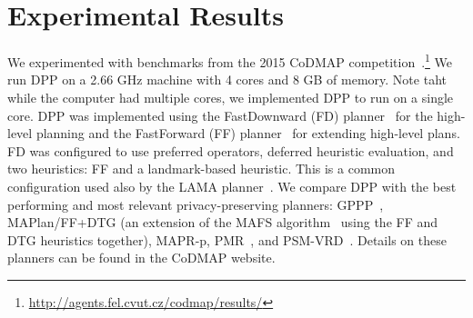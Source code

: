 \documentclass[letterpaper]{article}
\theoremstyle{definition}
\begin{document}
\begin{table}[t!]
\centering
{}
\caption{Coverage results for a timeout of 30 minutes over the CoDMAP instances.}
\label{tbl:codmap}
\end{table}

\section{Experimental Results}

We experimented with benchmarks from the 2015 CoDMAP competition~\cite{vstolba2015competition}.\footnote{\url{http://agents.fel.cvut.cz/codmap/results/}}
We run DPP on a 2.66 GHz machine with 4 cores and 8 GB of memory. Note taht while the computer had multiple cores, we implemented DPP to run on a single core. DPP was
implemented using the FastDownward (FD) planner~\cite{helmert2006fast} for the high-level planning and the FastForward (FF) planner~\cite{hoffmann2001ff} for extending high-level plans. FD was configured to use preferred operators, deferred heuristic evaluation, and two heuristics: FF and a landmark-based heuristic. This is a common configuration used also by the LAMA planner~\cite{richter2010lama}.  We compare DPP with the best performing and most relevant privacy-preserving planners: GPPP~\cite{maliah2015privacy}, MAPlan/FF+DTG (an extension of the MAFS algorithm~\cite{nissim2014distributed} using the FF and DTG heuristics together), MAPR-p, PMR~\cite{luis2014planMerging}, and PSM-VRD~\cite{tovzivcka2014generating,jakubuv2015multiagent}. Details on these planners can be found in the CoDMAP website.
\end{document}

